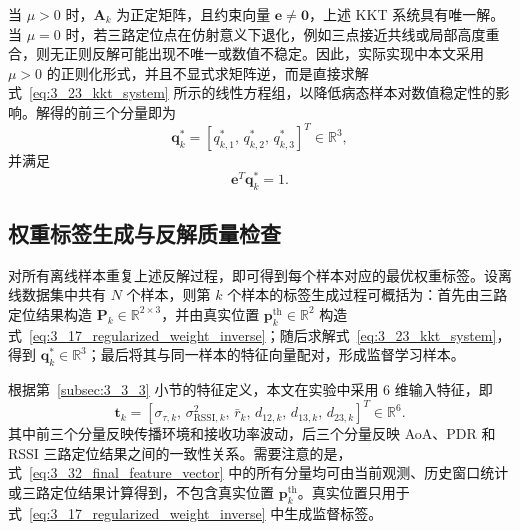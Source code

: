 当 \(\mu>0\) 时，\(\mathbf{A}_k\) 为正定矩阵，且约束向量 \(\mathbf{e}\neq\mathbf{0}\)，上述 KKT 系统具有唯一解。当 \(\mu=0\) 时，若三路定位点在仿射意义下退化，例如三点接近共线或局部高度重合，则无正则反解可能出现不唯一或数值不稳定。因此，实际实现中本文采用 \(\mu>0\) 的正则化形式，并且不显式求矩阵逆，而是直接求解式~\eqref{eq:3_23_kkt_system} 所示的线性方程组，以降低病态样本对数值稳定性的影响。解得的前三个分量即为
\begin{equation}
\mathbf{q}_k^\ast
=
\left[
q_{k,1}^\ast,\,
q_{k,2}^\ast,\,
q_{k,3}^\ast
\right]^T
\in\mathbb{R}^{3},
\label{eq:3_25_optimal_weight_label}
\end{equation}
并满足
\begin{equation}
\mathbf{e}^T\mathbf{q}_k^\ast=1.
\label{eq:3_26_optimal_weight_constraint}
\end{equation}

\subsection{权重标签生成与反解质量检查}
\label{subsec:3_4_3}

对所有离线样本重复上述反解过程，即可得到每个样本对应的最优权重标签。设离线数据集中共有 \(N\) 个样本，则第 \(k\) 个样本的标签生成过程可概括为：首先由三路定位结果构造 \(\mathbf{P}_k\in\mathbb{R}^{2\times3}\)，并由真实位置 \(\mathbf{p}_k^{\mathrm{th}}\in\mathbb{R}^{2}\) 构造式~\eqref{eq:3_17_regularized_weight_inverse}；随后求解式~\eqref{eq:3_23_kkt_system}，得到 \(\mathbf{q}_k^\ast\in\mathbb{R}^{3}\)；最后将其与同一样本的特征向量配对，形成监督学习样本。

根据第~\ref{subsec:3_3_3} 小节的特征定义，本文在实验中采用 6 维输入特征，即
\begin{equation}
\mathbf{t}_k
=
\left[
\sigma_{\tau,k},\,
\sigma^2_{\mathrm{RSSI},k},\,
\bar{r}_k,\,
d_{12,k},\,
d_{13,k},\,
d_{23,k}
\right]^T
\in\mathbb{R}^{6}.
\label{eq:3_32_final_feature_vector}
\end{equation}
其中前三个分量反映传播环境和接收功率波动，后三个分量反映 AoA、PDR 和 RSSI 三路定位结果之间的一致性关系。需要注意的是，式~\eqref{eq:3_32_final_feature_vector} 中的所有分量均可由当前观测、历史窗口统计或三路定位结果计算得到，不包含真实位置 \(\mathbf{p}_k^{\mathrm{th}}\)。真实位置只用于式~\eqref{eq:3_17_regularized_weight_inverse} 中生成监督标签。

